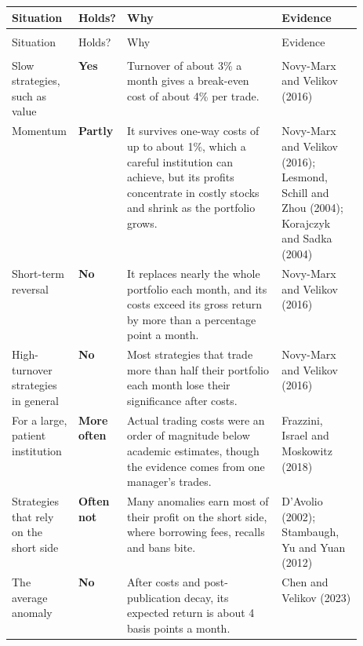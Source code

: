 {\small
\begin{longtable}{@{}>{\raggedright\arraybackslash}p{0.19\linewidth}>{\raggedright\arraybackslash}p{0.10\linewidth}>{\raggedright\arraybackslash}p{}>{\raggedright\arraybackslash}p{0.23\linewidth}@{}}
\toprule
Situation & Holds? & Why & Evidence \\
\midrule
\endfirsthead
\multicolumn{4}{@{}l}{\emph{(continued)}} \\
\toprule
Situation & Holds? & Why & Evidence \\
\midrule
\endhead
\midrule
\multicolumn{4}{r@{}}{\emph{(continued on the next page)}} \\
\endfoot
\bottomrule
\endlastfoot
Slow strategies, such as value & \textbf{Yes} & Turnover of about 3\% a month gives a break-even cost of about 4\% per trade. & Novy-Marx and Velikov (2016) \\
\addlinespace[3pt]
Momentum & \textbf{Partly} & It survives one-way costs of up to about 1\%, which a careful institution can achieve, but its profits concentrate in costly stocks and shrink as the portfolio grows. & Novy-Marx and Velikov (2016); Lesmond, Schill and Zhou (2004); Korajczyk and Sadka (2004) \\
\addlinespace[3pt]
Short-term reversal & \textbf{No} & It replaces nearly the whole portfolio each month, and its costs exceed its gross return by more than a percentage point a month. & Novy-Marx and Velikov (2016) \\
\addlinespace[3pt]
High-turnover strategies in general & \textbf{No} & Most strategies that trade more than half their portfolio each month lose their significance after costs. & Novy-Marx and Velikov (2016) \\
\addlinespace[3pt]
For a large, patient institution & \textbf{More often} & Actual trading costs were an order of magnitude below academic estimates, though the evidence comes from one manager's trades. & Frazzini, Israel and Moskowitz (2018) \\
\addlinespace[3pt]
Strategies that rely on the short side & \textbf{Often not} & Many anomalies earn most of their profit on the short side, where borrowing fees, recalls and bans bite. & D'Avolio (2002); Stambaugh, Yu and Yuan (2012) \\
\addlinespace[3pt]
The average anomaly & \textbf{No} & After costs and post-publication decay, its expected return is about 4 basis points a month. & Chen and Velikov (2023) \\
\end{longtable}
}

